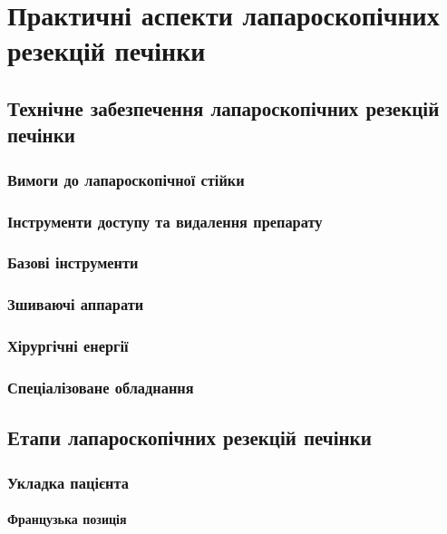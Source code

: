 \chapter{Практичні аспекти лапароскопічних резекцій печінки}
\begin{refsection}

\section{Технічне забезпечення лапароскопічних резекцій печінки}

\subsection{Вимоги до лапароскопічної стійки}

\subsection{Інструменти доступу та видалення препарату}

\subsection{Базові інструменти}

\subsection{Зшиваючі аппарати}

\subsection{Хірургічні енергії}

\subsection{Спеціалізоване обладнання}

\section{Етапи лапароскопічних резекцій печінки}


\subsection{Укладка пацієнта}

\subsubsection{Французька позиція}


\end{refsection}
